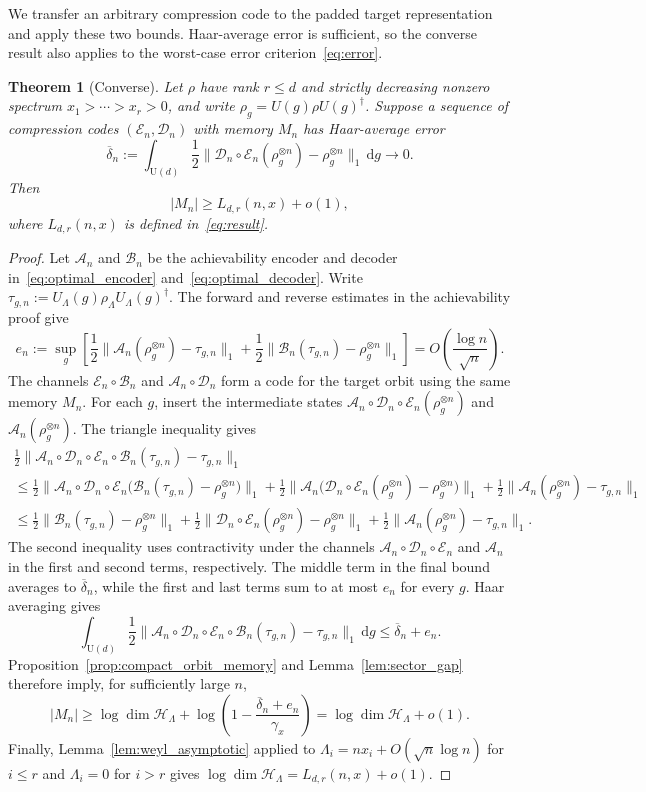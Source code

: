 \documentclass[a4paper,onecolumn,11pt]{quantumarticle}
\newtheorem{thm}{Theorem}
\newcommand{\dd}{\mathrm{d}}
\def\h{\mathcal{H}}
\def\D{\mathcal{D}}
\def\E{\mathcal{E}}
\begin{document}
We transfer an arbitrary compression code to the padded target
representation and apply these two bounds. Haar-average error is
sufficient, so the converse result also applies to the worst-case error
criterion~\eqref{eq:error}.

\begin{thm}[Converse]\label{thm:converse}
Let $\rho$ have rank $r\le d$ and strictly decreasing nonzero spectrum
$x_1>\cdots>x_r>0$, and write $\rho_g=U(g)\rho U(g)^\dagger$.
Suppose a sequence of compression codes $(\E_n,\D_n)$ with memory
$M_n$ has Haar-average error
\[
\overline\delta_n:=
\int_{\mathrm U(d)}\frac12
\|\D_n\circ\E_n(\rho_g^{\otimes n})-\rho_g^{\otimes n}\|_1\,\dd g
\longrightarrow0.
\]
Then
\[
|M_n|\ge L_{d,r}(n,x)+o(1),
\]
where $L_{d,r}(n,x)$ is defined in~\eqref{eq:result}.
\end{thm}
\begin{proof}
Let $\mathcal A_n$ and
$\mathcal B_n$ be the achievability encoder and decoder
in~\eqref{eq:optimal_encoder} and~\eqref{eq:optimal_decoder}.
Write $\tau_{g,n}:=U_{\Lambda}(g)\rho_{\Lambda}
U_{\Lambda}(g)^\dagger$. The forward and reverse
estimates in the achievability proof give
\[
e_n:=\sup_g\left[
\frac12\|\mathcal A_n(\rho_g^{\otimes n})-\tau_{g,n}\|_1
+\frac12\|\mathcal B_n(\tau_{g,n})-\rho_g^{\otimes n}\|_1
\right]
=O\!\left(\frac{\log n}{\sqrt n}\right).
\]
The channels $\E_n\circ\mathcal B_n$ and $\mathcal A_n\circ\D_n$
form a code for the target orbit using the same memory $M_n$.
For each $g$, insert the intermediate states
$\mathcal A_n\circ\D_n\circ\E_n(\rho_g^{\otimes n})$ and
$\mathcal A_n(\rho_g^{\otimes n})$. The triangle inequality gives
\begin{multline}
\frac12\|\mathcal A_n\circ\D_n\circ\E_n\circ\mathcal B_n(\tau_{g,n})
-\tau_{g,n}\|_1\\
\le\frac12\bigl\|\mathcal A_n\circ\D_n\circ\E_n
\bigl(\mathcal B_n(\tau_{g,n})-\rho_g^{\otimes n}\bigr)\bigr\|_1
+\frac12\bigl\|\mathcal A_n
\bigl(\D_n\circ\E_n(\rho_g^{\otimes n})-\rho_g^{\otimes n}\bigr)\bigr\|_1
+\frac12\|\mathcal A_n(\rho_g^{\otimes n})-\tau_{g,n}\|_1\\
\le\frac12\|\mathcal B_n(\tau_{g,n})-\rho_g^{\otimes n}\|_1
+\frac12\|\D_n\circ\E_n(\rho_g^{\otimes n})-\rho_g^{\otimes n}\|_1
+\frac12\|\mathcal A_n(\rho_g^{\otimes n})-\tau_{g,n}\|_1.
\end{multline}
The second inequality uses contractivity under the channels
$\mathcal A_n\circ\D_n\circ\E_n$ and $\mathcal A_n$ in the first
and second terms, respectively. The middle term in the final
bound averages to $\overline\delta_n$, while the first and last
terms sum to at most $e_n$ for every $g$. Haar averaging gives
\[
\int_{\mathrm U(d)}\frac12
\|\mathcal A_n\circ\D_n\circ\E_n\circ\mathcal B_n(\tau_{g,n})
-\tau_{g,n}\|_1\,\dd g
\le\overline\delta_n+e_n.
\]
Proposition~\ref{prop:compact_orbit_memory} and
Lemma~\ref{lem:sector_gap} therefore imply, for sufficiently large $n$,
\[
|M_n|\ge\log\dim\h_{\Lambda}
+\log\left(1-\frac{\overline\delta_n+e_n}{\gamma_x}\right)
=\log\dim\h_{\Lambda}+o(1).
\]
Finally, Lemma~\ref{lem:weyl_asymptotic} applied to
$\Lambda_i=nx_i+O(\sqrt n\log n)$ for $i\le r$ and
$\Lambda_i=0$ for $i>r$ gives
$\log\dim\h_{\Lambda}=L_{d,r}(n,x)+o(1)$.
\end{proof}
\end{document}
